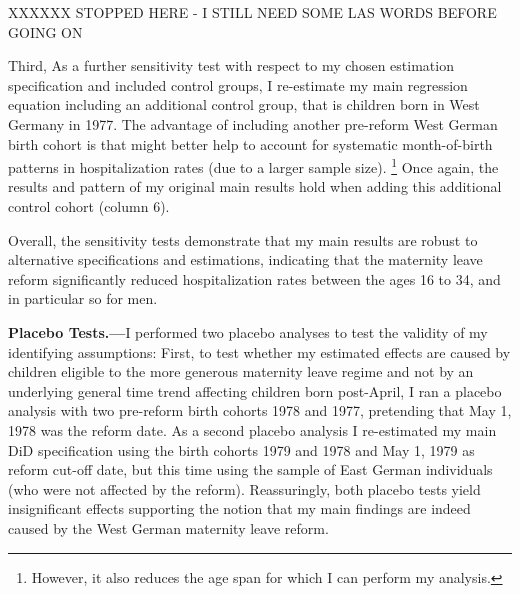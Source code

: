 \documentclass[11pt, a4paper,draft]{article} %
\begin{document}
XXXXXX STOPPED HERE - I STILL NEED SOME LAS WORDS BEFORE GOING ON

Third, 
As a further sensitivity test with respect to my chosen estimation specification and included control groups, I re-estimate my main regression equation including an additional control group, that is children born in West Germany in 1977. The advantage of including another pre-reform West German birth cohort is that might better help to account for systematic month-of-birth patterns in hospitalization rates (due to a larger sample size). \footnote{However, it also reduces the age span for which I can perform my analysis.}
Once again, the results and pattern of my original main results hold when adding this additional control cohort (column 6).\newline

Overall, the sensitivity tests demonstrate that my main results are robust to alternative specifications and estimations, indicating that the maternity leave reform significantly reduced hospitalization rates between the ages 16 to 34, and in particular so for men.\newline

\textbf{Placebo Tests.---}I performed two placebo analyses to test the validity of my identifying assumptions: First, to test whether my estimated effects are caused by children eligible to the more generous maternity leave regime and not by an underlying general time trend affecting children born post-April, I ran a placebo analysis with two pre-reform birth cohorts 1978 and 1977, pretending that May 1, 1978 was the reform date. As a second placebo analysis I re-estimated my main DiD specification using the birth cohorts 1979 and 1978 and May 1, 1979 as reform cut-off date, but this time using the sample of East German individuals (who were not affected by the reform). 
Reassuringly, both placebo tests yield insignificant effects supporting the notion that my main findings are indeed caused by the West German maternity leave reform.\newline
\end{document}
